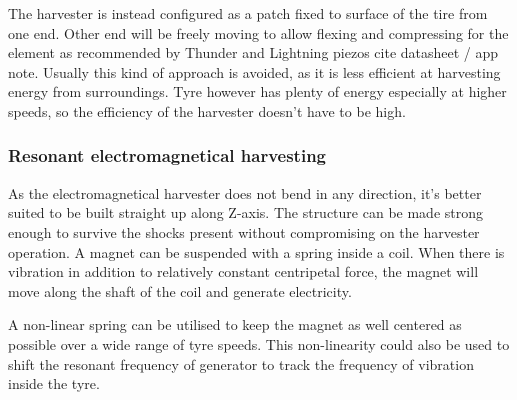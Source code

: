 The harvester is instead configured as a patch fixed to surface of the tire from one end. Other end will be freely moving to allow flexing and compressing for the element as recommended by Thunder and Lightning piezos {\color{red} cite datasheet / app note}. Usually this kind of approach is avoided, as it is less efficient at harvesting energy from surroundings. Tyre however has plenty of energy especially at higher speeds, so the efficiency of the harvester doesn't have to be high.

\subsubsection{Resonant electromagnetical harvesting}
As the electromagnetical harvester does not bend in any direction, it's better suited to be built straight up along Z-axis. The structure can be made strong enough to survive the shocks present without compromising on the harvester operation. A magnet can be suspended with a spring inside a coil. When there is vibration in addition to relatively constant centripetal force, the magnet will move along the shaft of the coil and generate electricity. 

A non-linear spring can be utilised to keep the magnet as well centered as possible over a wide range of tyre speeds. This non-linearity could also be used to shift the resonant frequency of generator to track the frequency of vibration inside the tyre. 

 




